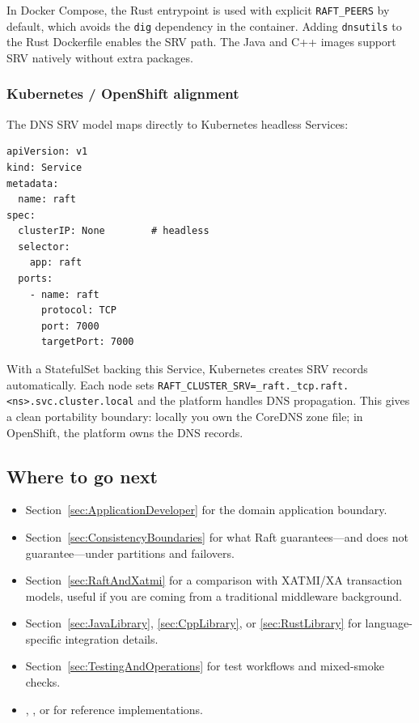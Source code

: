 In Docker Compose, the Rust entrypoint is used with explicit
\texttt{RAFT\_PEERS} by default, which avoids the \texttt{dig} dependency
in the container. Adding \texttt{dnsutils} to the Rust Dockerfile enables
the SRV path. The Java and C++ images support SRV natively without extra
packages.

\subsubsection{Kubernetes / OpenShift alignment}

The DNS SRV model maps directly to Kubernetes headless Services:

\begin{lstlisting}[style=yaml, caption={Kubernetes headless Service}]
apiVersion: v1
kind: Service
metadata:
  name: raft
spec:
  clusterIP: None        # headless
  selector:
    app: raft
  ports:
    - name: raft
      protocol: TCP
      port: 7000
      targetPort: 7000
\end{lstlisting}

With a StatefulSet backing this Service, Kubernetes creates SRV records
automatically. Each node sets
\texttt{RAFT\_CLUSTER\_SRV=\_raft.\_tcp.raft.\textless ns\textgreater .svc.cluster.local}
and the platform handles DNS propagation. This gives a clean portability
boundary: locally you own the CoreDNS zone file; in OpenShift, the
platform owns the DNS records.

\subsection{Where to go next}

\begin{itemize}
\item Section~\ref{sec:ApplicationDeveloper} for the domain application boundary.
\item Section~\ref{sec:ConsistencyBoundaries} for what Raft guarantees---and does
not guarantee---under partitions and failovers.
\item Section~\ref{sec:RaftAndXatmi} for a comparison with XATMI/XA transaction
models, useful if you are coming from a traditional middleware background.
\item Section~\ref{sec:JavaLibrary}, \ref{sec:CppLibrary}, or \ref{sec:RustLibrary}
for language-specific integration details.
\item Section~\ref{sec:TestingAndOperations} for test workflows and mixed-smoke checks.
\item {}, , or
 for reference implementations.
\end{itemize}
